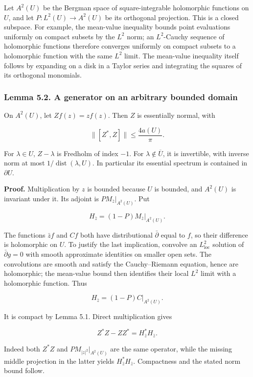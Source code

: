\documentclass[
  11pt,
]{article}
\begin{document}
Let \(A^2(U)\) be the Bergman space of square-integrable holomorphic
functions on \(U\), and let \(P:L^2(U)\to A^2(U)\) be its orthogonal
projection. This is a closed subspace. For example, the mean-value
inequality bounds point evaluations uniformly on compact subsets by the
\(L^2\) norm; an \(L^2\)-Cauchy sequence of holomorphic functions
therefore converges uniformly on compact subsets to a holomorphic
function with the same \(L^2\) limit. The mean-value inequality itself
follows by expanding on a disk in a Taylor series and integrating the
squares of its orthogonal monomials.

\subsubsection{Lemma 5.2. A generator on an arbitrary bounded
domain}\label{lemma-5.2.-a-generator-on-an-arbitrary-bounded-domain}

On \(A^2(U)\), let \(Zf(z)=zf(z)\). Then \(Z\) is essentially normal,
with

\[
\|[Z^*,Z]\|\leq\frac{4a(U)}\pi.
\]

For \(\lambda\in U\), \(Z-\lambda\) is Fredholm of index \(-1\). For
\(\lambda\notin\overline U\), it is invertible, with inverse norm at
most \(1/\operatorname{dist}(\lambda,U)\). In particular its essential
spectrum is contained in \(\partial U\).

\textbf{Proof.} Multiplication by \(z\) is bounded because \(U\) is
bounded, and \(A^2(U)\) is invariant under it. Its adjoint is
\(P M_{\bar z}|_{A^2(U)}\). Put

\[
H_{\bar z}=(1-P)M_{\bar z}|_{A^2(U)}.
\]

The functions \(\bar z f\) and \(Cf\) both have distributional
\(\bar\partial\) equal to \(f\), so their difference is holomorphic on
\(U\). To justify the last implication, convolve an
\(L^2_{\mathrm{loc}}\) solution of \(\bar\partial g=0\) with smooth
approximate identities on smaller open sets. The convolutions are smooth
and satisfy the Cauchy--Riemann equation, hence are holomorphic; the
mean-value bound then identifies their local \(L^2\) limit with a
holomorphic function. Thus

\[
H_{\bar z}=(1-P)C|_{A^2(U)}.
\]

It is compact by Lemma 5.1. Direct multiplication gives

\[
Z^*Z-ZZ^*=H_{\bar z}^*H_{\bar z}.
\]

Indeed both \(Z^*Z\) and \(P M_{|z|^2}|_{A^2(U)}\) are the same
operator, while the missing middle projection in the latter yields
\(H_{\bar z}^*H_{\bar z}\). Compactness and the stated norm bound
follow.
\end{document}
